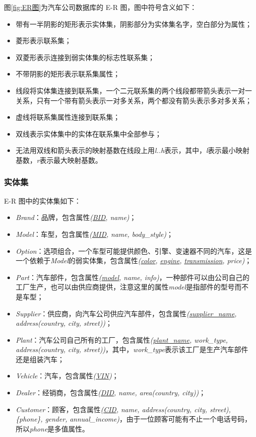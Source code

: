 \documentclass[hyperref,a4paper,UTF8]{ctexart}
\begin{document}
图\ref{fig:ER图}为汽车公司数据库的 E-R 图，图中符号含义如下：

\begin{itemize}[itemsep=2pt,topsep=0pt,parsep=0pt]
    \item 带有一半阴影的矩形表示实体集，阴影部分为实体集名字，空白部分为属性；
    \item 菱形表示联系集；
    \item 双菱形表示连接到弱实体集的标志性联系集；
    \item 不带阴影的矩形表示联系集属性；
    \item 线段将实体集连接到联系集，一个二元联系集的两个线段都带箭头表示一对一关系，只有一个带有箭头表示一对多关系，两个都没有箭头表示多对多关系；
    \item 虚线将联系集属性连接到联系集；
    \item 双线表示实体集中的实体在联系集中全部参与；
    \item 无法用双线和箭头表示的映射基数在线段上用\textit{l..h}表示，其中，\textit{l}表示最小映射基数，\textit{r}表示最大映射基数。
\end{itemize}

\subsubsection{实体集}

E-R 图中的实体集如下：

\begin{itemize}[itemsep=2pt,topsep=0pt,parsep=0pt]
    \item \textit{Brand}：品牌，包含属性\textit{(\underline{BID}, name)}；
    \item \textit{Model}：车型，包含属性\textit{(\underline{MID}, name, body\_style)}；
    \item \textit{Option}：选项组合，一个车型可能提供颜色、引擎、变速器不同的汽车，这是一个依赖于\textit{Model}的弱实体集，包含属性\textit{(\underline{color}, \underline{engine}, \underline{transmission}, price)}；
    \item \textit{Part}：汽车部件，包含属性\textit{(\underline{model}, name, info)}，一种部件可以由公司自己的工厂生产，也可以由供应商提供，注意这里的属性\textit{model}是指部件的型号而不是车型；
    \item \textit{Supplier}：供应商，向汽车公司供应汽车部件，包含属性\textit{(\underline{supplier\_name}, address(country, city, street))}；
    \item \textit{Plant}：汽车公司自己所有的工厂，包含属性\textit{(\underline{plant\_name}, work\_type, address(country, city, street))}，其中，\textit{work\_type}表示该工厂是生产汽车部件还是组装汽车；
    \item \textit{Vehicle}：汽车，包含属性\textit{(\underline{VIN})}；
    \item \textit{Dealer}：经销商，包含属性\textit{(\underline{DID}, name, area(country, city))}；
    \item \textit{Customer}：顾客，包含属性\textit{(\underline{CID}, name, address(country, city, street), \{phone\}, gender, annual\_income)}，由于一位顾客可能有不止一个电话号码，所以\textit{phone}是多值属性。
\end{itemize}
\end{document}
